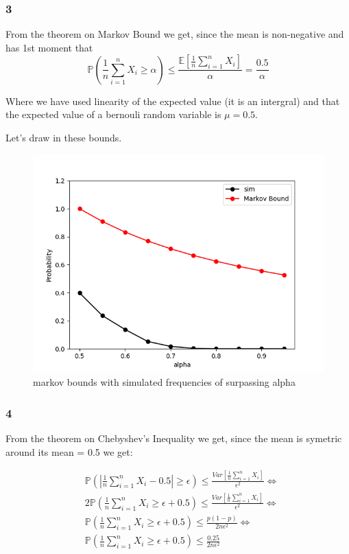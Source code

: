 \documentclass[a4paper,12pt]{article}
\begin{document}
\subsubsection*{3}
From the theorem on Markov Bound we get, since the mean is non-negative and has 1st moment that
$$
\mathbb{P}\left( \frac{1}{n}\sum_{i = 1}^nX_i \geq \alpha \right) \leq \frac{\mathbb{E}\left[ \frac{1}{n}\sum_{i = 1}^nX_i \right]}{\alpha} = \frac{0.5}{\alpha}
$$

Where we have used linearity of the expected value (it is an intergral) and that the expected value of a bernouli random variable is $\mu = 0.5$.

Let's draw in these bounds. 
\begin{figure}[htbp]
    \centering
    \includegraphics[width=0.5\linewidth]{HA2_2a_2.png}
    \caption{markov bounds with simulated frequencies of surpassing alpha} %
    \label{fig:2}
\end{figure}

\subsubsection*{4}
From the theorem on Chebyshev’s Inequality we get, since the mean is symetric around its mean = 0.5 we get:

\begin{align}
&\mathbb{P}\left( \left| \frac{1}{n}\sum_{i = 1}^nX_i - 0.5 \right| \geq \epsilon  \right) \leq \frac{Var\left[ \frac{1}{n}\sum_{i = 1}^nX_i \right]}{\epsilon^2} \Leftrightarrow
\\
&2\mathbb{P}\left(  \frac{1}{n}\sum_{i = 1}^nX_i \geq \epsilon + 0.5 \right) \leq \frac{Var\left[ \frac{1}{n}\sum_{i = 1}^nX_i \right]}{\epsilon^2} \Leftrightarrow
\\
&\mathbb{P}\left(  \frac{1}{n}\sum_{i = 1}^nX_i \geq \epsilon + 0.5 \right) \leq \frac{p(1-p)}{2n\epsilon^2} \Leftrightarrow
\\
&\mathbb{P}\left(  \frac{1}{n}\sum_{i = 1}^nX_i \geq \epsilon + 0.5 \right) \leq \frac{0.25}{2n\epsilon^2}
\end{align}
\end{document}

